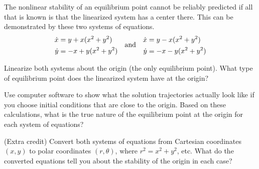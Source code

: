 \documentclass[boxes]{gsypset}
\begin{document}
	\begin{problem}
		The nonlinear stability of an equilibrium point cannot be
	  reliably predicted if all that is known is that the linearized
	  system has a center there.  This can be demonstrated by these two
	  systems of equations.
		\begin{align*}
			\dot{x} &= y+x(x^2+y^2) & 
				&\raisebox{-.1in}[0mm][0mm]{\text{and}} &
				\dot{x}&=y-x(x^2+y^2) \\
			\dot{y} &= -x+y(x^2+y^2) &&& \dot{y} &= -x-y(x^2+y^2)
		\end{align*}
		\begin{subproblems}
			\subproblem 
				Linearize both systems about the origin (the only equilibrium point). 
				What type of equilibrium point does the linearized system have at the origin?
				\begin{solution}
					
				\end{solution}
			\subproblem 
				Use computer software to show what the solution trajectories actually look like 
				if you choose initial conditions that are close to the origin. 
				Based on these calculations, what is the true nature of 
				the equilibrium point at the origin for each system of equations?
				\begin{solution}
					
				\end{solution}
			\subproblem (Extra credit) 
				Convert both systems of equations from Cartesian coordinates $(x,y)$ 
				to polar coordinates $(r,\theta)$, where $r^2=x^2+y^2$, etc. 
				What do the converted equations tell you about the stability of the origin in each case?
				\begin{solution}
					
				\end{solution}
		\end{subproblems}
	\end{problem}
	
\end{document}
